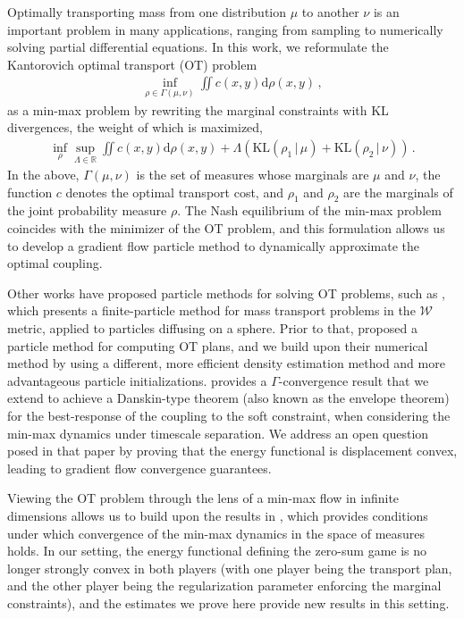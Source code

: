 \documentclass[11pt,a4paper,final]{article}
\newcommand{\KL}[2]{\text{KL}(#1\,|\,#2)}
\def\R{\mathbb R}
\newcommand{\Wass}{\mathscr{W}}
\renewcommand{\d}{\mathrm{d}}
\newcommand{\1}{\mathbf{1}}
\theoremstyle{plain}
\numberwithin{equation}{section}
\numberwithin{theorem}{section}
\begin{document}
Optimally transporting mass from one distribution $\mu$ to another $\nu$ is an important problem in many applications, ranging from sampling to numerically solving partial differential equations. In this work, we reformulate the Kantorovich optimal transport (OT) problem
\begin{align*}
    \inf_{\rho\in\Gamma(\mu,\nu)} \iint c(x,y)\d \rho(x,y) \,,
\end{align*}
as a min-max problem by rewriting the marginal constraints with KL divergences, the weight of which is maximized,
\begin{align*}
    \inf_{\rho} \sup_{\Lambda\in\R}  \iint c(x,y)\d \rho(x,y) + \Lambda \left(\KL{\rho_1}{\mu} + \KL{\rho_2}{\nu}\right) \,.
\end{align*}
In the above, $\Gamma(\mu,\nu)$ is the set of measures whose marginals are $\mu$ and $\nu$, the function $c$ denotes the optimal transport cost, and $\rho_1$ and $\rho_2$ are the marginals of the joint probability measure $\rho$.
The Nash equilibrium of the min-max problem coincides with the minimizer of the OT problem, and this formulation allows us to develop a gradient flow particle method to dynamically approximate the optimal coupling.


Other works have proposed particle methods for solving OT problems, such as \cite{pandolfi_optimal-transport_2023}, which presents a finite-particle method for mass transport problems in the $\Wass$ metric, applied to particles diffusing on a sphere. Prior to that, \cite{liu_approximating_2021}  proposed a particle method for computing OT plans,  and we build upon their numerical method by using a different, more efficient density estimation method and more advantageous particle initializations. \cite{liu_approximating_2021} provides a $\Gamma$-convergence result 
that we extend 
to achieve a Danskin-type theorem (also known as the envelope theorem) for the best-response of the coupling to the soft constraint, when considering the min-max dynamics under timescale separation. We address an open question posed in that paper by proving that the energy functional is displacement convex, leading to gradient flow convergence guarantees.


Viewing the OT problem through the lens of a min-max flow in infinite dimensions allows us to build upon the results in \cite{conger_coupled_2024}, which provides conditions under which convergence of the min-max dynamics in the space of measures holds. In our setting, the energy functional defining the zero-sum game is no longer strongly convex in both players (with one player being the transport plan, and the other player being the regularization parameter enforcing the marginal constraints), and the estimates we prove here provide new results in this setting. 
\end{document}

